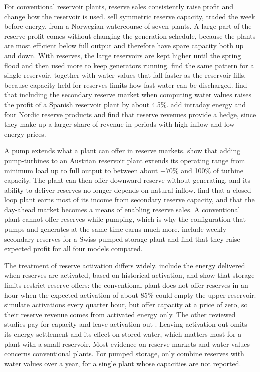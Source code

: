 For conventional reservoir plants, reserve sales consistently raise
profit and change how the reservoir is used. \citet{helseth2016} sell
symmetric reserve capacity, traded the week before energy, from a
Norwegian watercourse of seven plants. A large part of the reserve
profit comes without changing the generation schedule, because the
plants are most efficient below full output and therefore have spare
capacity both up and down. With reserves, the large reservoirs are kept
higher until the spring flood and then used more to keep generators
running. \citet{helseth2017iet} find the same pattern for a single
reservoir, together with water values that fall faster as the reservoir
fills, because capacity held for reserves limits how fast water can be
discharged. \citet{perezdiaz2020medium} find that including the
secondary reserve market when computing water values raises the profit
of a Spanish reservoir plant by about 4.5\%.
\citet{bore2026assessing} add intraday energy and four Nordic reserve
products and find that reserve revenues provide a hedge, since they make
up a larger share of revenue in periods with high inflow and low energy
prices.

A pump extends what a plant can offer in reserve markets.
\citet{dallinger2019socioeconomic} show that adding pump-turbines to an
Austrian reservoir plant extends its operating range from minimum load
up to full output to between about $-70$\% and 100\% of turbine
capacity. The plant can then offer downward reserve without generating,
and its ability to deliver reserves no longer depends on natural inflow.
\citet{chazarra2017} find that a closed-loop plant earns most of its
income from secondary reserve capacity, and that the day-ahead market
becomes a means of enabling reserve sales. A conventional plant cannot
offer reserves while pumping, which is why the configuration that pumps
and generates at the same time earns much more. \citet{abgottspon2014}
include weekly secondary reserves for a Swiss pumped-storage plant and
find that they raise expected profit for all four models compared.

The treatment of reserve activation differs widely. \citet{chazarra2017}
include the energy delivered when reserves are activated, based on
historical activation, and show that storage limits restrict reserve
offers: the conventional plant does not offer reserves in an hour when
the expected activation of about 85\% could empty the upper reservoir.
\citet{dallinger2019socioeconomic} simulate activations every quarter
hour, but offer capacity at a price of zero, so their reserve revenue
comes from activated energy only. The other reviewed studies pay for
capacity and leave activation out
\citep{helseth2016,helseth2017iet,abgottspon2014,bore2026assessing}.
Leaving activation out omits its energy settlement and its effect on
stored water, which matters most for a plant with a small reservoir.
Most evidence on reserve markets and water values concerns conventional
plants. For pumped storage, only \citet{abgottspon2014} combine reserves
with water values over a year, for a single plant whose capacities are
not reported.

